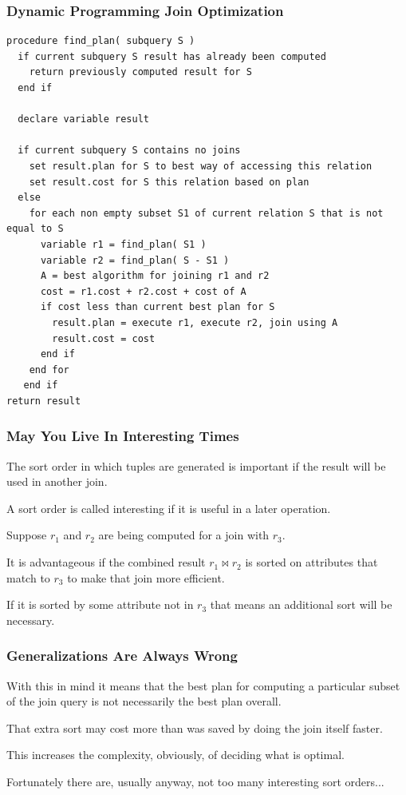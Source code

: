 \begin{frame}[fragile]
\frametitle{Dynamic Programming Join Optimization}
{\scriptsize
\begin{verbatim}
procedure find_plan( subquery S ) 
  if current subquery S result has already been computed
    return previously computed result for S
  end if

  declare variable result

  if current subquery S contains no joins
    set result.plan for S to best way of accessing this relation
    set result.cost for S this relation based on plan
  else 
    for each non empty subset S1 of current relation S that is not equal to S
      variable r1 = find_plan( S1 ) 
      variable r2 = find_plan( S - S1 )
      A = best algorithm for joining r1 and r2
      cost = r1.cost + r2.cost + cost of A
      if cost less than current best plan for S
        result.plan = execute r1, execute r2, join using A
        result.cost = cost
      end if  
    end for
   end if
return result
\end{verbatim}
}

\end{frame}

\begin{frame}
\frametitle{May You Live In Interesting Times}

The sort order in which tuples are generated is important if the result will be used in another join. 

A sort order is called \alert{interesting} if it is useful in a later operation. 

Suppose $r_{1}$ and $r_{2}$ are being computed for a join with $r_{3}$.

It is advantageous if the combined result $r_{1} \bowtie r_{2}$ is sorted on attributes that match to $r_{3}$ to make that join more efficient.

If it is sorted by some attribute not in $r_{3}$ that means an additional sort will be necessary.

\end{frame}

\begin{frame}
\frametitle{Generalizations Are Always Wrong}

With this in mind it means that the best plan for computing a particular subset of the join query is not necessarily the best plan overall. 

That extra sort may cost more than was saved by doing the join itself faster. 

This increases the complexity, obviously, of deciding what is optimal. 

Fortunately there are, usually anyway, not too many interesting sort orders...


\end{frame}

